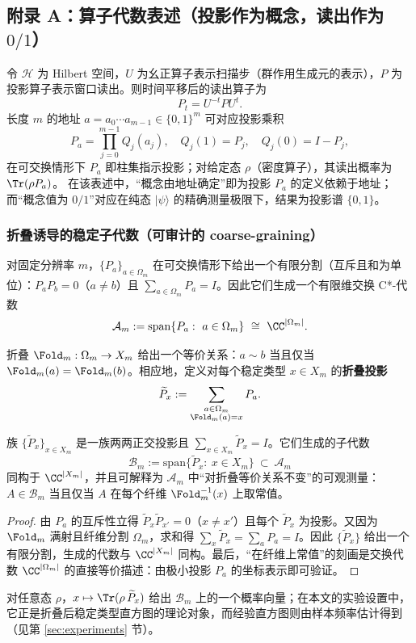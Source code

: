 \subsection{附录 A：算子代数表述（投影作为概念，读出作为 \texorpdfstring{$0/1$}{0/1}）}
\label{app:op-algebra}

令 $\mathcal{H}$ 为 Hilbert 空间，$U$ 为幺正算子表示扫描步（群作用生成元的表示），$P$ 为投影算子表示窗口读出。则时间平移后的读出算子为
\[
P_t=U^{-t}PU^t.
\]
长度 $m$ 的地址 $a=a_0\cdots a_{m-1}\in\{0,1\}^m$ 可对应投影乘积
\[
P_a=\prod_{j=0}^{m-1} Q_{j}(a_j),\quad
Q_{j}(1)=P_j,\quad Q_{j}(0)=I-P_j,
\]
在可交换情形下 $P_a$ 即柱集指示投影；对给定态 $\rho$（密度算子），其读出概率为 $\Tr(\rho P_a)$。
在该表述中，“概念由地址确定”即为投影 $P_a$ 的定义依赖于地址；而“概念值为 $0/1$”对应在纯态 $\lvert\psi\rangle$ 的精确测量极限下，结果为投影谱 $\{0,1\}$。

\subsubsection{折叠诱导的稳定子代数（可审计的 coarse-graining）}\label{app:op-algebra-fold-subalgebra}

对固定分辨率 $m$，$\{P_a\}_{a\in\Omega_m}$ 在可交换情形下给出一个有限分割（互斥且和为单位）：$P_aP_b=0$（$a\neq b$）且 $\sum_{a\in\Omega_m}P_a=I$。因此它们生成一个有限维交换 C*-代数
\[
\mathcal{A}_m:=\mathrm{span}\{P_a:\ a\in\Omega_m\}\ \cong\ \CC^{|\Omega_m|}.
\]

折叠 $\Fold_m:\Omega_m\to X_m$ 给出一个等价关系：$a\sim b$ 当且仅当 $\Fold_m(a)=\Fold_m(b)$。相应地，定义对每个稳定类型 $x\in X_m$ 的\textbf{折叠投影}
\[
\widetilde P_x:=\sum_{\substack{a\in\Omega_m\\ \Fold_m(a)=x}} P_a.
\]

\begin{proposition}[折叠不变量子代数]\label{prop:fold-invariant-subalgebra}
族 $\{\widetilde P_x\}_{x\in X_m}$ 是一族两两正交投影且 $\sum_{x\in X_m}\widetilde P_x=I$。它们生成的子代数
\[
\mathcal{B}_m:=\mathrm{span}\{\widetilde P_x:\ x\in X_m\}\ \subset\ \mathcal{A}_m
\]
同构于 $\CC^{|X_m|}$，并且可解释为 $\mathcal{A}_m$ 中“对折叠等价关系不变”的可观测量：$A\in\mathcal{B}_m$ 当且仅当 $A$ 在每个纤维 $\Fold_m^{-1}(x)$ 上取常值。
\end{proposition}

\begin{proof}
由 $P_a$ 的互斥性立得 $\widetilde P_x\widetilde P_{x'}=0$（$x\neq x'$）且每个 $\widetilde P_x$ 为投影。又因为 $\Fold_m$ 满射且纤维分割 $\Omega_m$，求和得 $\sum_{x}\widetilde P_x=\sum_{a}P_a=I$。因此 $\{\widetilde P_x\}$ 给出一个有限分割，生成的代数与 $\CC^{|X_m|}$ 同构。最后，“在纤维上常值”的刻画是交换代数 $\CC^{|\Omega_m|}$ 的直接等价描述：由极小投影 $P_a$ 的坐标表示即可验证。
\end{proof}

\begin{remark}[折叠直方图作为态的限制]
对任意态 $\rho$，$x\mapsto \Tr(\rho\,\widetilde P_x)$ 给出 $\mathcal{B}_m$ 上的一个概率向量；在本文的实验设置中，它正是折叠后稳定类型直方图的理论对象，而经验直方图则由样本频率估计得到（见第 \ref{sec:experiments} 节）。
\end{remark}
